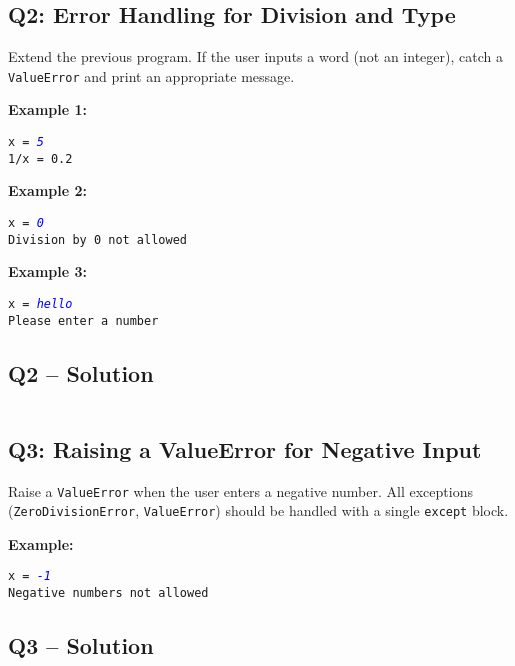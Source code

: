 \documentclass[a4paper,11pt]{article}
\begin{document}
\subsection*{Q2: Error Handling for Division and Type}
Extend the previous program. If the user inputs a word (not an integer), catch a \texttt{ValueError} and print an appropriate message.

\textbf{Example 1:}
\begin{flushleft}
	\texttt{x = \textcolor{blue}{\textit{5}}}\\
	\texttt{1/x = 0.2}
\end{flushleft}

\textbf{Example 2:}
\begin{flushleft}
	\texttt{x = \textcolor{blue}{\textit{0}}}\\
	\texttt{Division by 0 not allowed}
\end{flushleft}

\textbf{Example 3:}
\begin{flushleft}
	\texttt{x = \textcolor{blue}{\textit{hello}}}\\
	\texttt{Please enter a number}
\end{flushleft}


\subsection*{Q2 – Solution}
\inputminted{python}{Files/13/2.py}


\subsection*{Q3: Raising a ValueError for Negative Input}
Raise a \texttt{ValueError} when the user enters a negative number. All exceptions (\texttt{ZeroDivisionError}, \texttt{ValueError}) should be handled with a single \texttt{except} block.

\textbf{Example:}
\begin{flushleft}
	\texttt{x = \textcolor{blue}{\textit{-1}}}\\
	\texttt{Negative numbers not allowed}
\end{flushleft}

\subsection*{Q3 – Solution}
\inputminted{python}{Files/13/3.py}
	
\end{document}

